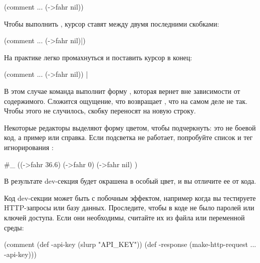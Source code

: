 \begin{english}
  \begin{clojure}
(comment
  ...
  (->fahr nil))
  \end{clojure}
\end{english}

Чтобы выполнить , курсор ставят между двумя последними скобками:

\begin{english}
  \begin{clojure}
(comment
  ...
  (->fahr nil)|)
  \end{clojure}
\end{english}

На практике легко промахнуться и поставить курсор в конец:

\begin{english}
  \begin{clojure}
(comment
  ...
  (->fahr nil)) |
  \end{clojure}
\end{english}

В этом случае команда  выполнит форму , которая вернет  вне зависимости от содержимого. Сложится ощущение, что  возвращает , что на самом деле не так. Чтобы этого не случилось, скобку  переносят на новую строку.

Некоторые редакторы выделяют форму  цветом, чтобы подчеркнуть: это не боевой код, а пример или справка. Если подсветка не работает, попробуйте список и тег игнорирования \code{\#\_}:

\begin{english}
  \begin{clojure}
#_
((->fahr 36.6)
  (->fahr 0)
  (->fahr nil)
)
  \end{clojure}
\end{english}

В результате dev-секция будет окрашена в особый цвет, и вы отличите ее от кода.

Код dev-секции может быть с побочным эффектом, например когда вы тестируете HTTP-запросы или базу данных. Проследите, чтобы в коде не было паролей или ключей доступа. Если они необходимы, считайте их из файла или переменной среды:

\begin{english}
  \begin{clojure}
(comment
  (def -api-key
    (slurp "API_KEY"))
  (def -response
    (make-http-request ... -api-key)))
  \end{clojure}
\end{english}



